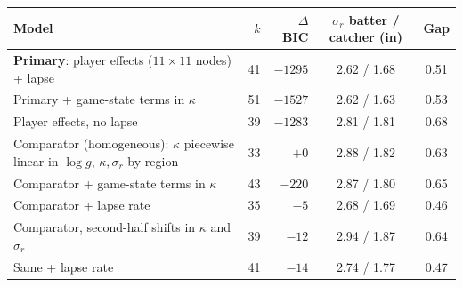 \begin{tabular}{p{5.6cm}rrcc}
\toprule
Model & $k$ & $\Delta$BIC & $\sigma_r$ batter / catcher (in) & Gap \\
\midrule
\textbf{Primary}: player effects ($11\times11$ nodes) + lapse & 41 & $-1295$ & 2.62 / 1.68 & 0.51 \\
Primary + game-state terms in $\kappa$ & 51 & $-1527$ & 2.62 / 1.63 & 0.53 \\
Player effects, no lapse & 39 & $-1283$ & 2.81 / 1.81 & 0.68 \\
Comparator (homogeneous): $\kappa$ piecewise linear in $\log g$, $\kappa,\sigma_r$ by region & 33 & $+0$ & 2.88 / 1.82 & 0.63 \\
Comparator + game-state terms in $\kappa$ & 43 & $-220$ & 2.87 / 1.80 & 0.65 \\
Comparator + lapse rate & 35 & $-5$ & 2.68 / 1.69 & 0.46 \\
Comparator, second-half shifts in $\kappa$ and $\sigma_r$ & 39 & $-12$ & 2.94 / 1.87 & 0.64 \\
Same + lapse rate & 41 & $-14$ & 2.74 / 1.77 & 0.47 \\
\bottomrule
\end{tabular}
